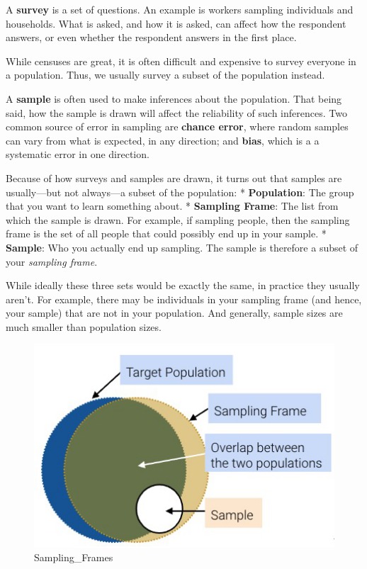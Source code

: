 \documentclass[
  letterpaper,
  DIV=11,
  numbers=noendperiod]{scrreprt}
\begin{document}
A \textbf{survey} is a set of questions. An example is workers sampling
individuals and households. What is asked, and how it is asked, can
affect how the respondent answers, or even whether the respondent
answers in the first place.

While censuses are great, it is often difficult and expensive to survey
everyone in a population. Thus, we usually survey a subset of the
population instead.

A \textbf{sample} is often used to make inferences about the population.
That being said, how the sample is drawn will affect the reliability of
such inferences. Two common source of error in sampling are
\textbf{chance error}, where random samples can vary from what is
expected, in any direction; and \textbf{bias}, which is a a systematic
error in one direction.

Because of how surveys and samples are drawn, it turns out that samples
are usually---but not always---a subset of the population: *
\textbf{Population}: The group that you want to learn something about. *
\textbf{Sampling Frame}: The list from which the sample is drawn. For
example, if sampling people, then the sampling frame is the set of all
people that could possibly end up in your sample. * \textbf{Sample}: Who
you actually end up sampling. The sample is therefore a subset of your
\emph{sampling frame}.

While ideally these three sets would be exactly the same, in practice
they usually aren't. For example, there may be individuals in your
sampling frame (and hence, your sample) that are not in your population.
And generally, sample sizes are much smaller than population sizes.

\begin{figure}

{\centering \includegraphics{sampling/images/samplingframe.png}

}

\caption{Sampling\_Frames}

\end{figure}
\end{document}
